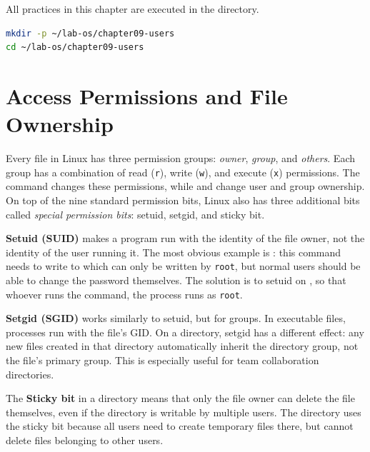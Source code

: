 \begin{notebox}
All practices in this chapter are executed in the  directory.
\begin{lstlisting}[language=bash]
mkdir -p ~/lab-os/chapter09-users
cd ~/lab-os/chapter09-users
\end{lstlisting}
\end{notebox}

\section{Access Permissions and File Ownership}
\label{sec:advanced-permissions}

Every file in Linux has three permission groups: \textit{owner}, \textit{group}, and \textit{others}. Each group has a combination of read (\texttt{r}), write (\texttt{w}), and execute (\texttt{x}) permissions. The  command changes these permissions, while  and  change user and group ownership. On top of the nine standard permission bits, Linux also has three additional bits called \textit{special permission bits}: setuid, setgid, and sticky bit.

\textbf{Setuid (SUID)} makes a program run with the identity of the file owner, not the identity of the user running it. The most obvious example is : this command needs to write to  which can only be written by \texttt{root}, but normal users should be able to change the password themselves. The solution is to setuid on , so that whoever runs the command, the process runs as \texttt{root}.

\textbf{Setgid (SGID)} works similarly to setuid, but for groups. In executable files, processes run with the file's GID. On a directory, setgid has a different effect: any new files created in that directory automatically inherit the directory group, not the file's primary group. This is especially useful for team collaboration directories.

The \textbf{Sticky bit} in a directory means that only the file owner can delete the file themselves, even if the directory is writable by multiple users. The  directory uses the sticky bit because all users need to create temporary files there, but cannot delete files belonging to other users.

